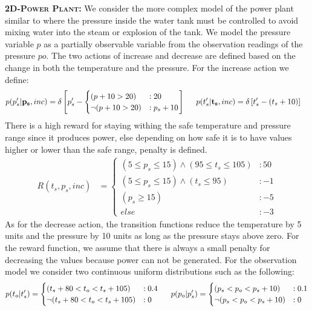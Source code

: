 \documentclass{article} %
\renewcommand{\vec}[1]{\mathbf{#1}} %
\begin{document}
{\bf \textsc{\bf 2D-Power Plant}:} We consider the more complex model of the power plant similar to \cite{steam2} where the pressure inside the water tank must be controlled to avoid mixing water into the steam or explosion of the tank. We model the pressure variable $p$ as a partially observable variable from the observation readings of the pressure $po$. The two actions of increase and decrease are defined based on the change in both the temperature and the pressure. For the increase action we define: %
{\footnotesize
\begin{align}
p(p_s'|\vec{p_s},inc)&= \delta\left[ p_s' - 
\begin{cases}
 (p+10> 20) &: 20 \\ 
\neg (p+10> 20) &: p_s + 10 \\
\end{cases}
\right]\nonumber
\hspace{5mm} 
p(t_s'|\vec{t_s},inc)= \delta\left[ t_s' - (t_s +10) \right]\nonumber
\end{align}
}
There is a high reward for staying withing the safe temperature and pressure range since it produces power, else depending on how safe it is to have values higher or lower than the safe range, penalty is defined.
{\footnotesize
\vspace{-3mm}
\begin{align}
R(t_s,p_s,inc) &= 
\begin{cases}
(5 \leq p_s \leq 15)\wedge (95 \leq t_s \leq 105)&:50\\
(5 \leq p_s \leq 15)\wedge (t_s \leq 95)&: -1\\
(p_s \geq 15) &: -5\\ 
else &: -3
\end{cases}\nonumber
\end{align}
}
As for the decrease action, the transition functions reduce the temperature by 5 units and the pressure by 10 units as long as the pressure stays above zero. For the reward function, we assume that there is always a small penalty for decreasing the values because power can not be generated. 
For the observation model we consider two continuous uniform distributions such as the following:  
{\footnotesize
\begin{align}
p(t_o|t_s') = 
\begin{cases}
(t_s + 80<t_o<t_s+ 105) &: 0.4 \\
 \neg (t_s + 80<t_o<t_s+ 105) &: 0 \\
\end{cases}\nonumber
\hspace{5mm} 
p(p_o|p_s') = 
\begin{cases}
(p_s<p_o<p_s+10) &: 0.1 \\
 \neg(p_s<p_o<p_s+10) &: 0 \\
\end{cases}\nonumber
\end{align}
}
\end{document}
